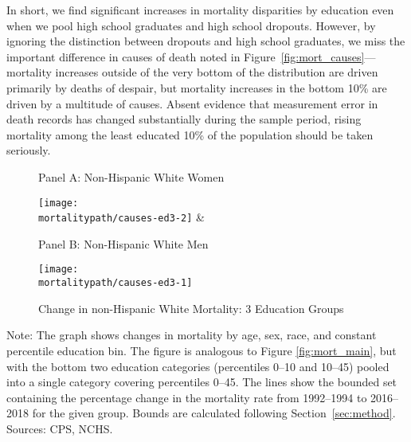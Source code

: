 In short, we find significant increases in mortality disparities by education even when we pool high school graduates and high school dropouts.  However, by ignoring the distinction between dropouts and high school graduates, we miss the important difference in causes of death noted in Figure~\ref{fig:mort_causes}---mortality increases outside of the very bottom of the distribution are driven primarily by deaths of despair, but mortality increases in the bottom 10\% are driven by a multitude of causes. Absent evidence that measurement error in death records has changed substantially during the sample period, rising mortality among the least educated 10\% of the population should be taken seriously.

\begin{figure}[H]
  \caption{Change in non-Hispanic White Mortality: 3 Education Groups}
  \label{fig:causes_3ed}
  
  \begin{center}
    \vspace{-.6cm} Panel A: Non-Hispanic White Women
  \end{center}
  \begin{center}
    \texttt{[image: \\mortalitypath/causes-ed3-2]} &
  \end{center}
  
  \begin{center}
    \vspace{-.6cm} Panel B: Non-Hispanic White Men
  \end{center}
  \begin{center}
    \texttt{[image: \\mortalitypath/causes-ed3-1]} \\
  \end{center}
\end{figure}
\tiny{ Note: The graph shows changes in mortality by age, sex, race, and constant percentile education bin. The figure is analogous to Figure \ref{fig:mort_main}, but with the bottom two education categories (percentiles 0--10 and 10--45) pooled into a single category covering percentiles 0--45.  The lines show the bounded set containing the percentage change in the mortality rate from 1992--1994 to 2016--2018 for the given group. Bounds are calculated following Section~\ref{sec:method}. Sources: CPS, NCHS.}
